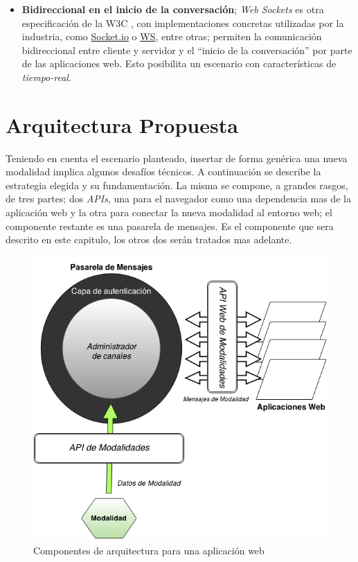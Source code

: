 \begin{itemize}

\item \textbf{Bidireccional en el inicio de la conversación}; \emph{Web Sockets} es otra especificación de la W3C \citep{infra:websockets}, con implementaciones concretas utilizadas por la industria, como \href{http://socket.io/}{Socket.io} o \href{http://einaros.github.io/ws/}{WS}, entre otras; permiten la comunicación bidireccional entre cliente y servidor y el ``inicio de la conversación'' por parte de las aplicaciones web. Esto posibilita un escenario con características de \emph{tiempo-real}.
\end{itemize}

\section{Arquitectura Propuesta} \label{sec:arq_ours}
Teniendo en cuenta el escenario planteado, insertar de forma genérica una nueva modalidad implica algunos desafíos técnicos. A continuación se describe la estrategia elegida y su fundamentación. La misma se compone, a grandes rasgos, de tres partes; dos \emph{APIs}, una para el navegador como una dependencia mas de la aplicación web y la otra para conectar la nueva modalidad al entorno web; el componente restante es una pasarela de mensajes. Es el componente que sera descrito en este capitulo, los otros dos serán tratados mas adelante.

\begin{center}
  \begin{figure}[h]
    \includegraphics[scale=1,width=\textwidth]{gfx/arq_simple_es}
    \caption{Componentes de arquitectura para una aplicación web}
    \label{fig:arq_ours_single_app}
  \end{figure}
\end{center}

